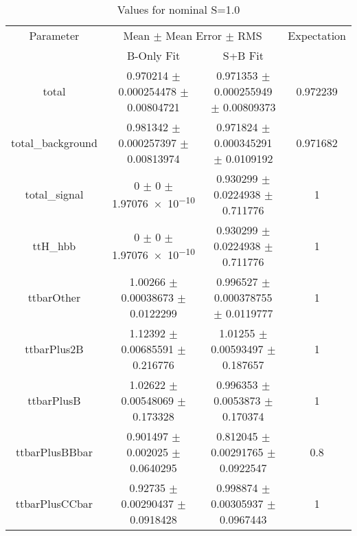\begin{table}
\centering
\caption{Values for nominal S=1.0}
\begin{tabular}{cccc}
\toprule
Parameter & \multicolumn{2}{c}{Mean $\pm$ Mean Error $\pm$ RMS} & Expectation\\
 & B-Only Fit & S+B Fit & \\
\midrule
total & \num{0.970214} $\pm$ \num{0.000254478} $\pm$ \num{0.00804721} & \num{0.971353} $\pm$ \num{0.000255949} $\pm$ \num{0.00809373} & \num{0.972239}\\
total\_background & \num{0.981342} $\pm$ \num{0.000257397} $\pm$ \num{0.00813974} & \num{0.971824} $\pm$ \num{0.000345291} $\pm$ \num{0.0109192} & \num{0.971682}\\
total\_signal & \num{0} $\pm$ \num{0} $\pm$ \num{1.97076e-10} & \num{0.930299} $\pm$ \num{0.0224938} $\pm$ \num{0.711776} & \num{1}\\
ttH\_hbb & \num{0} $\pm$ \num{0} $\pm$ \num{1.97076e-10} & \num{0.930299} $\pm$ \num{0.0224938} $\pm$ \num{0.711776} & \num{1}\\
ttbarOther & \num{1.00266} $\pm$ \num{0.00038673} $\pm$ \num{0.0122299} & \num{0.996527} $\pm$ \num{0.000378755} $\pm$ \num{0.0119777} & \num{1}\\
ttbarPlus2B & \num{1.12392} $\pm$ \num{0.00685591} $\pm$ \num{0.216776} & \num{1.01255} $\pm$ \num{0.00593497} $\pm$ \num{0.187657} & \num{1}\\
ttbarPlusB & \num{1.02622} $\pm$ \num{0.00548069} $\pm$ \num{0.173328} & \num{0.996353} $\pm$ \num{0.0053873} $\pm$ \num{0.170374} & \num{1}\\
ttbarPlusBBbar & \num{0.901497} $\pm$ \num{0.002025} $\pm$ \num{0.0640295} & \num{0.812045} $\pm$ \num{0.00291765} $\pm$ \num{0.0922547} & \num{0.8}\\
ttbarPlusCCbar & \num{0.92735} $\pm$ \num{0.00290437} $\pm$ \num{0.0918428} & \num{0.998874} $\pm$ \num{0.00305937} $\pm$ \num{0.0967443} & \num{1}\\
\bottomrule
\end{tabular}
\end{table}